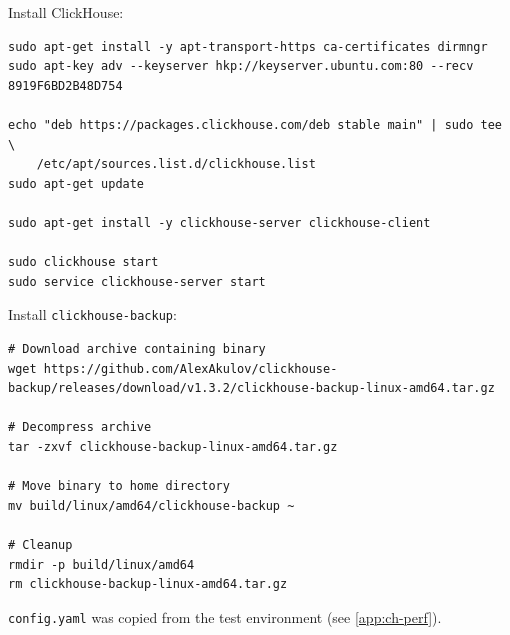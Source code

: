 Install ClickHouse:
\begin{verbatim}
sudo apt-get install -y apt-transport-https ca-certificates dirmngr
sudo apt-key adv --keyserver hkp://keyserver.ubuntu.com:80 --recv 8919F6BD2B48D754

echo "deb https://packages.clickhouse.com/deb stable main" | sudo tee \
    /etc/apt/sources.list.d/clickhouse.list
sudo apt-get update

sudo apt-get install -y clickhouse-server clickhouse-client

sudo clickhouse start
sudo service clickhouse-server start
\end{verbatim}

Install \texttt{clickhouse-backup}:
\begin{verbatim}
# Download archive containing binary
wget https://github.com/AlexAkulov/clickhouse-backup/releases/download/v1.3.2/clickhouse-backup-linux-amd64.tar.gz

# Decompress archive
tar -zxvf clickhouse-backup-linux-amd64.tar.gz

# Move binary to home directory
mv build/linux/amd64/clickhouse-backup ~

# Cleanup
rmdir -p build/linux/amd64
rm clickhouse-backup-linux-amd64.tar.gz
\end{verbatim}

\texttt{config.yaml} was copied from the test environment (see \ref{app:ch-perf}).

